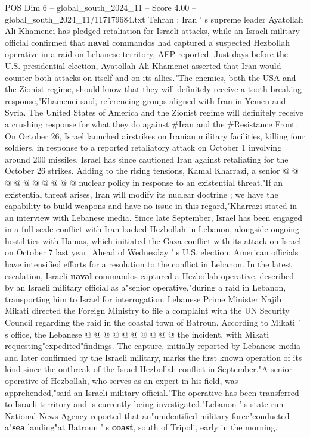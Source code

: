 \begin{textsample}{POS Dim 6 – global\_south\_2024\_11 – Score 4.00 – global\_south\_2024\_11/117179684.txt}  \label{ex:f6_pos_388}
Tehran : Iran ' s supreme leader Ayatollah Ali Khamenei has pledged retaliation for Israeli attacks, while an Israeli military official confirmed that \textbf{naval} commandos had captured a suspected Hezbollah operative in a raid on Lebanese territory, AFP reported.
Just days before the U.S. presidential election, Ayatollah Ali Khamenei asserted that Iran would counter both attacks on itself and on its allies."The enemies, both the USA and the Zionist regime, should know that they will definitely receive a tooth-breaking response,"Khamenei said, referencing groups aligned with Iran in Yemen and Syria.
The United States of America and the Zionist regime will definitely receive a crushing response for what they do against \#Iran and the \#Resistance Front.
On October 26, Israel launched airstrikes on Iranian military facilities, killing four soldiers, in response to a reported retaliatory attack on October 1 involving around 200 missiles.
Israel has since cautioned Iran against retaliating for the October 26 strikes.
Adding to the rising tensions, Kamal Kharrazi, a senior @ @ @ @ @ @ @ @ @ @ nuclear policy in response to an existential threat."If an existential threat arises, Iran will modify its nuclear doctrine ; we have the capability to build weapons and have no issue in this regard,"Kharrazi stated in an interview with Lebanese media.
Since late September, Israel has been engaged in a full-scale conflict with Iran-backed Hezbollah in Lebanon, alongside ongoing hostilities with Hamas, which initiated the Gaza conflict with its attack on Israel on October 7 last year.
Ahead of Wednesday ' s U.S. election, American officials have intensified efforts for a resolution to the conflict in Lebanon.
In the latest escalation, Israeli \textbf{naval} commandos captured a Hezbollah operative, described by an Israeli military official as a"senior operative,"during a raid in Lebanon, transporting him to Israel for interrogation.
Lebanese Prime Minister Najib Mikati directed the Foreign Ministry to file a complaint with the UN Security Council regarding the raid in the coastal town of Batroun.
According to Mikati ' s office, the Lebanese @ @ @ @ @ @ @ @ @ @ the incident, with Mikati requesting"expedited"findings.
The capture, initially reported by Lebanese media and later confirmed by the Israeli military, marks the first known operation of its kind since the outbreak of the Israel-Hezbollah conflict in September."A senior operative of Hezbollah, who serves as an expert in his field, was apprehended,"said an Israeli military official."The operative has been transferred to Israeli territory and is currently being investigated."Lebanon ' s state-run National News Agency reported that an"unidentified military force"conducted a"\textbf{sea} landing"at Batroun ' s \textbf{coast}, south of Tripoli, early in the morning.

\end{textsample}

